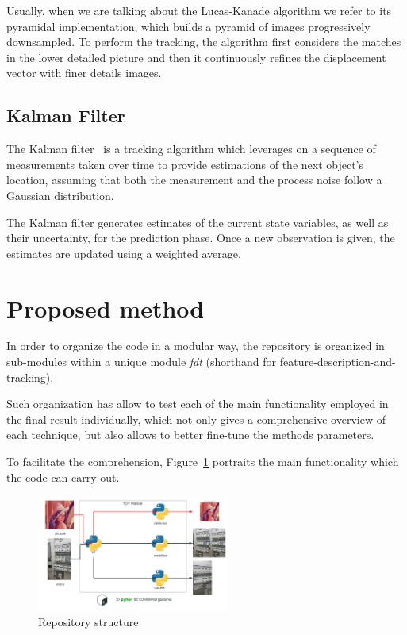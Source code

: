 \documentclass[journal]{IEEEtran}
\begin{document}
Usually, when we are talking about the Lucas-Kanade algorithm we refer to its pyramidal implementation, which builds a pyramid of images progressively downsampled. To perform the tracking, the algorithm first considers the matches in the lower detailed picture and then it continuously refines the displacement vector with finer details images.

\subsection{Kalman Filter}
The Kalman filter~\cite{kalman1960new} is a tracking algorithm which leverages on a sequence of measurements taken over time to provide estimations of the next object's location, assuming that both the measurement and the process noise follow a Gaussian distribution.

The Kalman filter generates estimates of the current state variables, as well as their uncertainty, for the prediction phase. Once a new observation is given, the estimates are updated using a weighted average.

\section{Proposed method}
\label{sec:projectstructure}
In order to organize the code in a modular way, the repository is organized in sub-modules within a unique module \emph{fdt} (shorthand for feature-description-and-tracking). 

Such organization has allow to test each of the main functionality employed in the final result individually, which not only gives a comprehensive overview of each technique, but also allows to better fine-tune the methods parameters.

To facilitate the comprehension, Figure~\ref{fig:repository} portraits the main functionality which the code can carry out. 

\begin{figure}
    \centering
    \includegraphics[angle=270,origin=c,width=2.5in]{images/structure.png}
    \caption{Repository structure}
    \label{fig:repository}
\end{figure}
\end{document}
